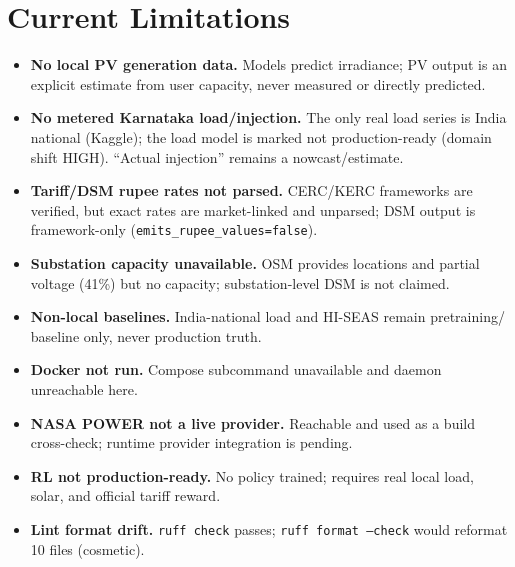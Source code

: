 \documentclass[11pt,a4paper]{article}
\newcommand{\code}[1]{\texttt{\small #1}}
\begin{document}
\section{Current Limitations}
\begin{itemize}[leftmargin=1.4em,itemsep=2pt]
\item \textbf{No local PV generation data.} Models predict irradiance; PV output is an
explicit estimate from user capacity, never measured or directly predicted.
\item \textbf{No metered Karnataka load/injection.} The only real load series is India
national (Kaggle); the load model is marked not production-ready (domain shift HIGH).
``Actual injection'' remains a nowcast/estimate.
\item \textbf{Tariff/DSM rupee rates not parsed.} CERC/KERC frameworks are verified, but
exact rates are market-linked and unparsed; DSM output is framework-only
(\code{emits\_rupee\_values=false}).
\item \textbf{Substation capacity unavailable.} OSM provides locations and partial
voltage (41\%) but no capacity; substation-level DSM is not claimed.
\item \textbf{Non-local baselines.} India-national load and HI-SEAS remain pretraining/
baseline only, never production truth.
\item \textbf{Docker not run.} Compose subcommand unavailable and daemon unreachable here.
\item \textbf{NASA POWER not a live provider.} Reachable and used as a build cross-check;
runtime provider integration is pending.
\item \textbf{RL not production-ready.} No policy trained; requires real local load,
solar, and official tariff reward.
\item \textbf{Lint format drift.} \code{ruff check} passes; \code{ruff format --check}
would reformat 10 files (cosmetic).
\end{itemize}

\end{document}
